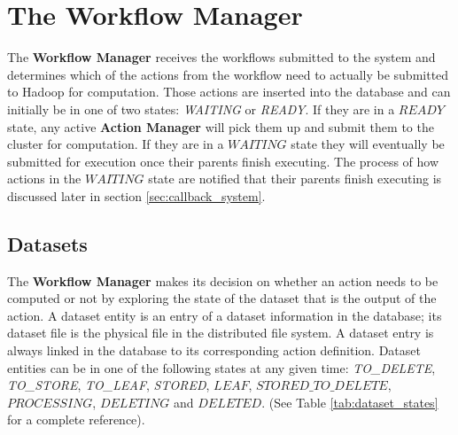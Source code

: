 \section{The Workflow Manager}
The \textbf{Workflow Manager} receives the workflows submitted to the system and determines which of the actions from the workflow need to actually be submitted to Hadoop for computation. Those actions are inserted into the database and can initially be in one of two states: \textit{WAITING} or \textit{READY}. If they are in a $READY$ state, any active \textbf{Action Manager} will pick them up and submit them to the cluster for computation. If they are in a $WAITING$ state they will eventually be submitted for execution once their parents finish executing. The process of how actions in the $WAITING$ state are notified that their parents finish executing is discussed later in section \ref{sec:callback_system}.

\subsection{Datasets}
The \textbf{Workflow Manager} makes its decision on whether an action needs to be computed or not by exploring the state of the dataset that is the output of the action.  A dataset entity is an entry of a dataset information in the database; its dataset file is the physical file in the distributed file system. A dataset entry is always linked in the database to its corresponding action definition. Dataset entities can be in one of the following states at any given time: \textit{TO\_DELETE}, \textit{TO\_STORE}, \textit{TO\_LEAF}, \textit{STORED}, $LEAF$, $STORED\_TO\_DELETE$, $PROCESSING$, $DELETING$ and $DELETED$. (See Table \ref{tab:dataset_states} for a complete reference).

